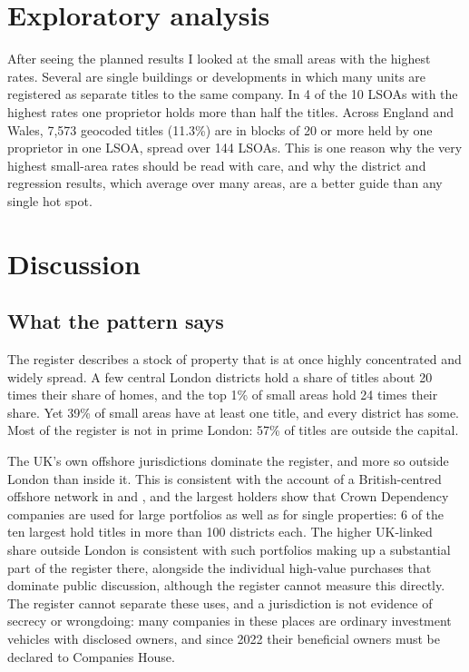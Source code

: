\documentclass[11pt,a4paper]{article}
\begin{document}
\section{Exploratory analysis}\label{sec:explore}
After seeing the planned results I looked at the small areas with the highest rates. Several are single buildings or developments in which many units are registered as separate titles to the same company. In 4 of the 10 LSOAs with the highest rates one proprietor holds more than half the titles. Across England and Wales, 7,573 geocoded titles (11.3\%) are in blocks of 20 or more held by one proprietor in one LSOA, spread over 144 LSOAs. This is one reason why the very highest small-area rates should be read with care, and why the district and regression results, which average over many areas, are a better guide than any single hot spot.

\section{Discussion}\label{sec:disc}
\subsection{What the pattern says}
The register describes a stock of property that is at once highly concentrated and widely spread. A few central London districts hold a share of titles about 20 times their share of homes, and the top 1\% of small areas hold 24 times their share. Yet 39\% of small areas have at least one title, and every district has some. Most of the register is not in prime London: 57\% of titles are outside the capital.

The UK's own offshore jurisdictions dominate the register, and more so outside London than inside it. This is consistent with the account of a British-centred offshore network in \citet{haberly2015a} and \citet{palan2010}, and the largest holders show that Crown Dependency companies are used for large portfolios as well as for single properties: 6 of the ten largest hold titles in more than 100 districts each. The higher UK-linked share outside London is consistent with such portfolios making up a substantial part of the register there, alongside the individual high-value purchases that dominate public discussion, although the register cannot measure this directly. The register cannot separate these uses, and a jurisdiction is not evidence of secrecy or wrongdoing: many companies in these places are ordinary investment vehicles with disclosed owners, and since 2022 their beneficial owners must be declared to Companies House.
\end{document}
